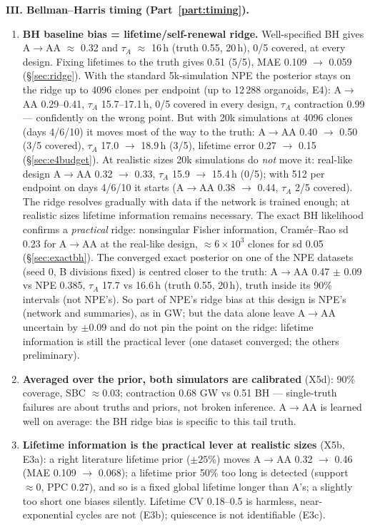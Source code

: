 \documentclass[10pt,a4paper]{article}
\newcommand{\tA}{$\tau_A$}
\begin{document}
\textbf{III. Bellman--Harris timing (Part~\ref{part:timing}).}
\begin{enumerate}[resume,leftmargin=1.4em]
\item \textbf{BH baseline bias = lifetime/self-renewal ridge.} Well-specified BH gives A$\to$AA $\approx$ 0.32 and \tA{} $\approx$ 16\,h (truth 0.55, 20\,h), 0/5 covered, at every design. Fixing lifetimes to the truth gives 0.51 (5/5), MAE 0.109 $\to$ 0.059 (\S\ref{sec:ridge}). With the standard 5k-simulation NPE the posterior stays on the ridge up to 4096 clones per endpoint (up to 12\,288 organoids, E4): A$\to$AA 0.29--0.41, \tA{} 15.7--17.1\,h, 0/5 covered in every design, \tA{} contraction 0.99 --- confidently on the wrong point. But with 20k simulations at 4096 clones (days 4/6/10) it moves most of the way to the truth: A$\to$AA 0.40 $\to$ 0.50 (3/5 covered), \tA{} 17.0 $\to$ 18.9\,h (3/5), lifetime error 0.27 $\to$ 0.15 (\S\ref{sec:e4budget}). At realistic sizes 20k simulations do \emph{not} move it: real-like design A$\to$AA 0.32 $\to$ 0.33, \tA{} 15.9 $\to$ 15.4\,h (0/5); with 512 per endpoint on days 4/6/10 it starts (A$\to$AA 0.38 $\to$ 0.44, \tA{} 2/5 covered). The ridge resolves gradually with data if the network is trained enough; at realistic sizes lifetime information remains necessary. The exact BH likelihood confirms a \emph{practical} ridge: nonsingular Fisher information, Cram\'er--Rao sd 0.23 for A$\to$AA at the real-like design, $\approx 6\times10^3$ clones for sd 0.05 (\S\ref{sec:exactbh}). The converged exact posterior on one of the NPE datasets (seed 0, B divisions fixed) is centred closer to the truth: A$\to$AA 0.47 $\pm$ 0.09 vs NPE 0.385, \tA{} 17.7 vs 16.6\,h (truth 0.55, 20\,h), truth inside its 90\% intervals (not NPE's). So part of NPE's ridge bias at this design is NPE's (network and summaries), as in GW; but the data alone leave A$\to$AA uncertain by $\pm 0.09$ and do not pin the point on the ridge: lifetime information is still the practical lever (one dataset converged; the others preliminary).
\item \textbf{Averaged over the prior, both simulators are calibrated} (X5d): 90\% coverage, SBC $\approx 0.03$; contraction 0.68 GW vs 0.51 BH --- single-truth failures are about truths and priors, not broken inference. A$\to$AA is learned well on average: the BH ridge bias is specific to this tail truth.
\item \textbf{Lifetime information is the practical lever at realistic sizes} (X5b, E3a): a right literature lifetime prior ($\pm 25\%$) moves A$\to$AA 0.32 $\to$ 0.46 (MAE 0.109 $\to$ 0.068); a lifetime prior 50\% too long is detected (support $\approx 0$, PPC 0.27), and so is a fixed global lifetime longer than A's; a slightly too short one biases silently. Lifetime CV 0.18--0.5 is harmless, near-exponential cycles are not (E3b); quiescence is not identifiable (E3c).

\end{enumerate}
\end{document}
